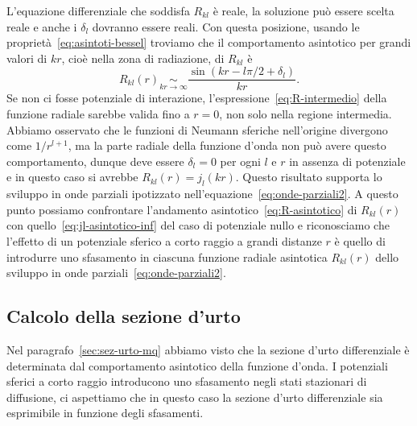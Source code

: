 \documentclass[a4paper,fleqn,twoside,12pt]{article}
\begin{document}
L'equazione differenziale che soddisfa $R_{kl}$ è reale, la soluzione può essere
scelta reale e anche i $\delta_{l}$ dovranno essere reali.  Con questa
posizione, usando le proprietà~\eqref{eq:asintoti-bessel} troviamo che il
comportamento asintotico per grandi valori di $kr$, cioè nella zona di
radiazione, di $R_{kl}$ è
\begin{equation}
  \label{eq:R-asintotico}
  R_{kl}(r) \underset{kr \to \infty}{\sim} \frac{\sin(kr - l\pi/2 +
    \delta_{l})}{kr}.
\end{equation}
Se non ci fosse potenziale di interazione, l'espressione~\eqref{eq:R-intermedio}
della funzione radiale sarebbe valida fino a $r=0$, non solo nella regione
intermedia.  Abbiamo osservato che le funzioni di Neumann sferiche nell'origine
divergono come $1/r^{l+1}$, ma la parte radiale della funzione d'onda non può
avere questo comportamento, dunque deve essere $\delta_{l} = 0$ per ogni $l$ e
$r$ in assenza di potenziale e in questo caso si avrebbe $R_{kl}(r) =
j_{l}(kr)$.
Questo risultato supporta lo sviluppo in onde parziali ipotizzato
nell'equazione~\eqref{eq:onde-parziali2}.  A questo punto possiamo confrontare
l'andamento asintotico~\eqref{eq:R-asintotico} di $R_{kl}(r)$ con
quello~\eqref{eq:jl-asintotico-inf} del caso di potenziale nullo e riconosciamo
che l'effetto di un potenziale sferico a corto raggio a grandi distanze $r$ è
quello di introdurre uno sfasamento in ciascuna funzione radiale asintotica
$R_{kl}(r)$ dello sviluppo in onde parziali~\eqref{eq:onde-parziali2}.

\subsection{Calcolo della sezione d'urto}
\label{sec:sez-urto-op}

Nel paragrafo~\ref{sec:sez-urto-mq} abbiamo visto che la sezione d'urto
differenziale è determinata dal comportamento asintotico della funzione d'onda.
I potenziali sferici a corto raggio introducono uno sfasamento negli stati
stazionari di diffusione, ci aspettiamo che in questo caso la sezione d'urto
differenziale sia esprimibile in funzione degli sfasamenti.
\end{document}
